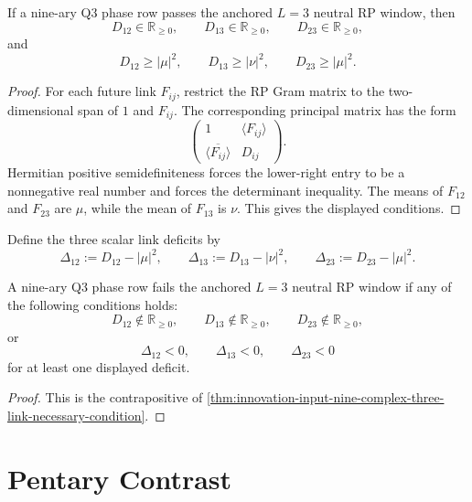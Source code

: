\begin{theorem}
\label{thm:innovation-input-nine-complex-three-link-necessary-condition}
If a nine-ary Q3 phase row passes the anchored $L=3$ neutral RP window,
then
$$
D_{12}\in\mathbb R_{\ge0},
\qquad
D_{13}\in\mathbb R_{\ge0},
\qquad
D_{23}\in\mathbb R_{\ge0},
$$
and
$$
D_{12}\ge|\mu|^2,
\qquad
D_{13}\ge|\nu|^2,
\qquad
D_{23}\ge|\mu|^2.
$$
\end{theorem}

\begin{proof}
For each future link $F_{ij}$, restrict the RP Gram matrix to the
two-dimensional span of $1$ and $F_{ij}$. The corresponding principal
matrix has the form
$$
\begin{pmatrix}
1 & \langle F_{ij}\rangle\\
\overline{\langle F_{ij}\rangle} & D_{ij}
\end{pmatrix}.
$$
Hermitian positive semidefiniteness forces the lower-right entry to be a
nonnegative real number and forces the determinant inequality. The means
of $F_{12}$ and $F_{23}$ are $\mu$, while the mean of $F_{13}$ is $\nu$.
This gives the displayed conditions.
\end{proof}

\begin{definition}
\label{def:innovation-input-nine-complex-link-deficits}
Define the three scalar link deficits by
$$
\Delta_{12}:=D_{12}-|\mu|^2,
\qquad
\Delta_{13}:=D_{13}-|\nu|^2,
\qquad
\Delta_{23}:=D_{23}-|\mu|^2.
$$
\end{definition}

\begin{corollary}
\label{cor:innovation-input-nine-complex-scalar-deficit-obstruction}
A nine-ary Q3 phase row fails the anchored $L=3$ neutral RP window if any
of the following conditions holds:
$$
D_{12}\notin\mathbb R_{\ge0},
\qquad
D_{13}\notin\mathbb R_{\ge0},
\qquad
D_{23}\notin\mathbb R_{\ge0},
$$
or
$$
\Delta_{12}<0,
\qquad
\Delta_{13}<0,
\qquad
\Delta_{23}<0
$$
for at least one displayed deficit.
\end{corollary}

\begin{proof}
This is the contrapositive of
\autoref{thm:innovation-input-nine-complex-three-link-necessary-condition}.
\end{proof}

\section{Pentary Contrast}
\label{sec:innovation-input-nine-complex-pentary-contrast}

